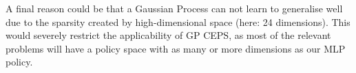 A final reason could be that a Gaussian Process can not learn to generalise well due to the sparsity created by high-dimensional space (here: 24 dimensions). This would severely restrict the applicability of GP CEPS, as most of the relevant problems will have a policy space with as many or more dimensions as our MLP policy.

